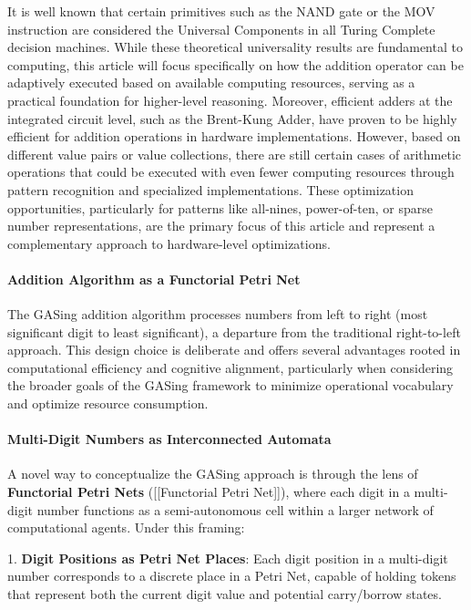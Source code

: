 It is well known that certain primitives such as the NAND gate or the MOV instruction are considered the Universal Components in all Turing Complete decision machines. While these theoretical universality results are fundamental to computing, this article will focus specifically on how the addition operator can be adaptively executed based on available computing resources, serving as a practical foundation for higher-level reasoning. Moreover, efficient adders at the integrated circuit level, such as the Brent-Kung Adder, have proven to be highly efficient for addition operations in hardware implementations. However, based on different value pairs or value collections, there are still certain cases of arithmetic operations that could be executed with even fewer computing resources through pattern recognition and specialized implementations. These optimization opportunities, particularly for patterns like all-nines, power-of-ten, or sparse number representations, are the primary focus of this article and represent a complementary approach to hardware-level optimizations.
\paragraph{Addition Algorithm as a Functorial Petri Net}

The GASing addition algorithm processes numbers from left to right (most significant digit to least significant), a departure from the traditional right-to-left approach. This design choice is deliberate and offers several advantages rooted in computational efficiency and cognitive alignment, particularly when considering the broader goals of the GASing framework to minimize operational vocabulary and optimize resource consumption.
\paragraph{Multi-Digit Numbers as Interconnected Automata}

A novel way to conceptualize the GASing approach is through the lens of \textbf{Functorial Petri Nets} ([[Functorial Petri Net]]), where each digit in a multi-digit number functions as a semi-autonomous cell within a larger network of computational agents. Under this framing:

1. \textbf{Digit Positions as Petri Net Places}: Each digit position in a multi-digit number corresponds to a discrete place in a Petri Net, capable of holding tokens that represent both the current digit value and potential carry/borrow states.


